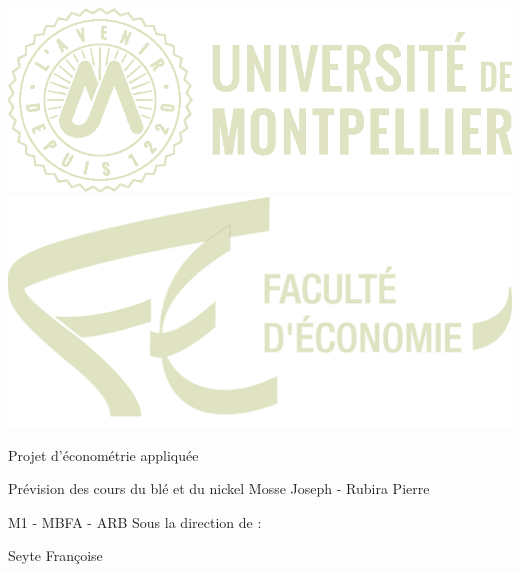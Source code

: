 \documentclass[11pt,a4paper]{article}
\begin{document}
\afterpage{\restoregeometry}
\pagecolor{mytan}\afterpage{\nopagecolor}
\thispagestyle{empty}
\begin{center}
\includegraphics{um3.png} \hspace{5em} \includegraphics[scale=0.25]{eco.png} \par
\vfill
\titlefont \textcolor{light}{Projet d'économétrie appliquée}\par\vspace{0.5cm}
\subtitlefont \textcolor{light}{Prévision des cours du blé et du nickel}
\vfill
\namefont \textcolor{light}{Mosse Joseph - Rubira Pierre}\par\vspace{0.2cm}
\namefont \textcolor{light}{M1 - MBFA - ARB}
\vfill
\namefont \textcolor{light}{Sous la direction de :}\par\vspace{0.2cm}
\namefont \textcolor{light}{Seyte Françoise}
\end{center}

\begin{center}
\end{center}
\end{document}
